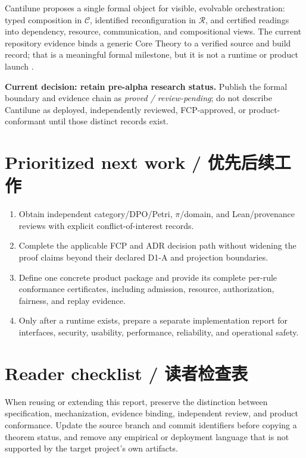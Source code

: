 \label{ch:conclusion}

Cantilune proposes a single formal object for visible, evolvable orchestration: typed composition
in \(\mathcal C\), identified reconfiguration in \(\mathcal R\), and certified readings into
dependency, resource, communication, and compositional views. The current repository evidence
binds a generic Core Theory to a verified source and build record; that is a meaningful formal
milestone, but it is not a runtime or product launch \citep{cantiluneReadme,cantiluneClosure}.

\begin{MWDecision}
\textbf{Current decision: retain pre-alpha research status.} Publish the formal boundary and
evidence chain as \emph{proved / review-pending}; do not describe Cantilune as deployed,
independently reviewed, FCP-approved, or product-conformant until those distinct records exist.
\end{MWDecision}

\section{Prioritized next work / 优先后续工作}

\begin{enumerate}
  \item Obtain independent category/DPO/Petri, \(\pi\)/domain, and Lean/provenance reviews with
    explicit conflict-of-interest records.
  \item Complete the applicable FCP and ADR decision path without widening the proof claims beyond
    their declared D1-A and projection boundaries.
  \item Define one concrete product package and provide its complete per-rule conformance
    certificates, including admission, resource, authorization, fairness, and replay evidence.
  \item Only after a runtime exists, prepare a separate implementation report for interfaces,
    security, usability, performance, reliability, and operational safety.
\end{enumerate}

\section{Reader checklist / 读者检查表}

When reusing or extending this report, preserve the distinction between specification,
mechanization, evidence binding, independent review, and product conformance. Update the source
branch and commit identifiers before copying a theorem status, and remove any empirical or
deployment language that is not supported by the target project's own artifacts.

